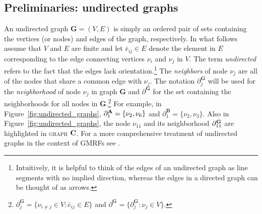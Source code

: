 \subsection{Preliminaries: undirected graphs}
\label{undirected_graphs}

An undirected graph $\mathbf{G} = (V,E)$ is simply an ordered pair of sets containing the 
vertices (or nodes) and edges of the graph, respectively. In what follows assume that $V$ 
and $E$ are finite and let $\bar{e}_{ij} \in E$ denote the element in $E$ corresponding to the 
edge connecting vertices $\nu_i$ and $\nu_j$ in $V$. The term {\it undirected} refers to the fact 
that the edges lack orientation.\footnote{Intuitively, it is helpful to think of the edges of an 
undirected graph as line segments with no implied direction, whereas the edges in a directed 
graph can be thought of as arrows.} The {\it neighbors} of node $\nu_j$ are all of the nodes that 
share a common edge with $\nu_j$. The notation $\partial^{\mathbf{G}}_j$ will be used for the 
{\it neighborhood} of node $\nu_j$ in graph  $\mathbf{G}$ and $\partial^\mathbf{G}$ for the set 
containing the neighborhoods for all nodes in $\mathbf{G}$.\footnote{$ \partial^\mathbf{G}_j = 
\{\nu_{i \neq j} \in V : \bar{e}_{ij} \in E\}$ and 
$\partial^\mathbf{G} = \{\partial^\mathbf{G}_j : \nu_j \in V\}$.} 
For example, in Figure~\ref{fig:undirected_graphs}, 
$\partial^{\mathbf{A}}_1 = \{\nu_2, \nu_6\}$ and $\partial^{\mathbf{B}}_1 = \{\nu_2, \nu_3\}$. 
Also in Figure~\ref{fig:undirected_graphs}, the node $\nu_{11}$ and its neighborhood 
$\partial^{\mathbf{G}}_{11}$ are highlighted in \textsc{graph $\mathbf{C}$}. 
For a more comprehensive treatment of undirected graphs in the context of GMRFs see 
. 

